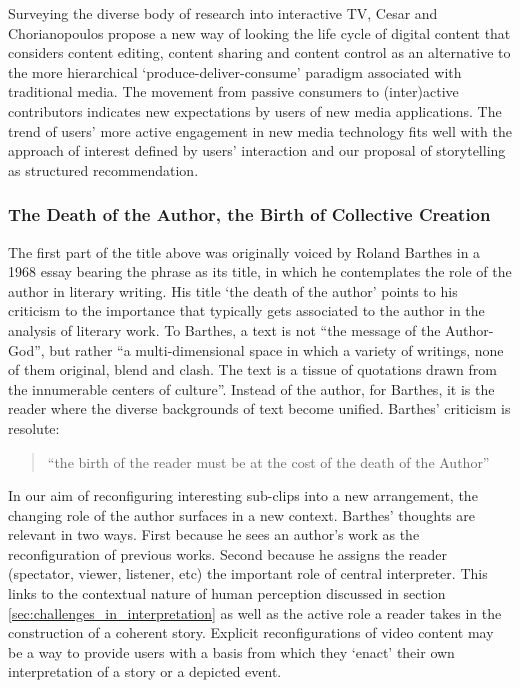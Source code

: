 Surveying the diverse body of research into interactive TV, Cesar and Chorianopoulos propose a new way of looking the life cycle of digital content that considers content editing, content sharing and content control as an alternative to the more hierarchical `produce-deliver-consume' paradigm associated with traditional media\cite{Cesar:2009fk}. The movement from passive consumers to (inter)active contributors indicates new expectations by users of new media applications. The trend of users' more active engagement in new media technology fits well with the approach of interest defined by users' interaction and our proposal of storytelling as structured recommendation.

\subsubsection{The Death of the Author, the Birth of Collective Creation}
The first part of the title above was originally voiced by Roland Barthes in a 1968 essay bearing the phrase as its title, in which he contemplates the role of the author in literary writing\cite{Barthes:1977wq}. His title `the death of the author' points to his criticism to the importance that typically gets associated to the author in the analysis of literary work. To Barthes, a text is not ``the \“message\” of the Author-God'', but rather ``a multi-dimensional space in which a variety of writings, none of them original, blend and clash. The text is a tissue of quotations drawn from the innumerable centers of culture''. Instead of the author, for Barthes, it is the reader where the diverse backgrounds of text become unified. Barthes' criticism is resolute:

\begin{quote}
  ``the birth of the reader must be at the cost of the death of the Author''
\end{quote}

In our aim of reconfiguring interesting sub-clips into a new arrangement, the changing role of the author surfaces in a new context. Barthes' thoughts are relevant in two ways. First because he sees an author's work as the reconfiguration of previous works. Second because he assigns the reader (spectator, viewer, listener, etc) the important role of central interpreter. This links to the contextual nature of human perception discussed in section \ref{sec:challenges_in_interpretation} as well as the active role a reader takes in the construction of a coherent story. Explicit reconfigurations of video content may be a way to provide users with a basis from which they `enact' their own interpretation of a story or a depicted event.

